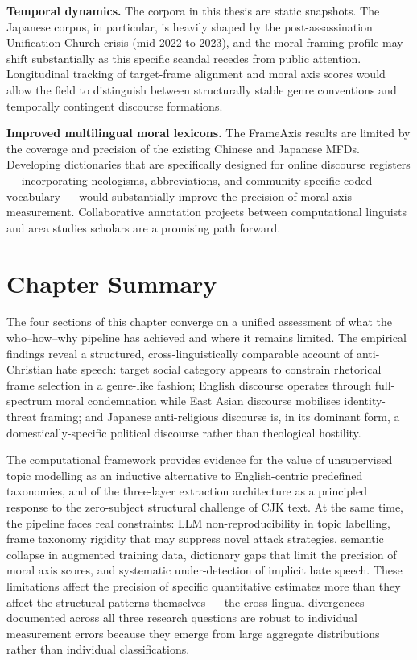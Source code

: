 \documentclass[../CLthesis.tex]{subfiles}
\begin{document}
\textbf{Temporal dynamics.} The corpora in this thesis are static snapshots. The Japanese corpus, in particular, is heavily shaped by the post-assassination Unification Church crisis (mid-2022 to 2023), and the moral framing profile may shift substantially as this specific scandal recedes from public attention. Longitudinal tracking of target-frame alignment and moral axis scores would allow the field to distinguish between structurally stable genre conventions and temporally contingent discourse formations.

\textbf{Improved multilingual moral lexicons.} The FrameAxis results are limited by the coverage and precision of the existing Chinese and Japanese MFDs. Developing dictionaries that are specifically designed for online discourse registers --- incorporating neologisms, abbreviations, and community-specific coded vocabulary --- would substantially improve the precision of moral axis measurement. Collaborative annotation projects between computational linguists and area studies scholars are a promising path forward.

\section{Chapter Summary}

The four sections of this chapter converge on a unified assessment of what the who--how--why pipeline has achieved and where it remains limited. The empirical findings reveal a structured, cross-linguistically comparable account of anti-Christian hate speech: target social category appears to constrain rhetorical frame selection in a genre-like fashion; English discourse operates through full-spectrum moral condemnation while East Asian discourse mobilises identity-threat framing; and Japanese anti-religious discourse is, in its dominant form, a domestically-specific political discourse rather than theological hostility.

The computational framework provides evidence for the value of unsupervised topic modelling as an inductive alternative to English-centric predefined taxonomies, and of the three-layer extraction architecture as a principled response to the zero-subject structural challenge of CJK text. At the same time, the pipeline faces real constraints: LLM non-reproducibility in topic labelling, frame taxonomy rigidity that may suppress novel attack strategies, semantic collapse in augmented training data, dictionary gaps that limit the precision of moral axis scores, and systematic under-detection of implicit hate speech. These limitations affect the precision of specific quantitative estimates more than they affect the structural patterns themselves --- the cross-lingual divergences documented across all three research questions are robust to individual measurement errors because they emerge from large aggregate distributions rather than individual classifications.
\end{document}
